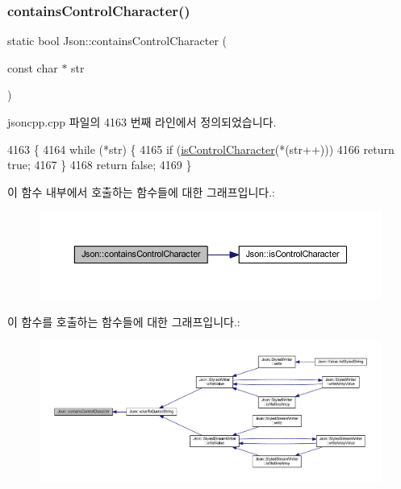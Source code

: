 \subsubsection{\texorpdfstring{contains\+Control\+Character()}{containsControlCharacter()}}
{\footnotesize\ttfamily static bool Json\+::contains\+Control\+Character (\begin{DoxyParamCaption}\item[{const char $\ast$}]{str }\end{DoxyParamCaption})\hspace{0.3cm}{\ttfamily [static]}}



jsoncpp.\+cpp 파일의 4163 번째 라인에서 정의되었습니다.


\begin{DoxyCode}
4163                                                       \{
4164   \textcolor{keywordflow}{while} (*str) \{
4165     \textcolor{keywordflow}{if} (\hyperlink{namespace_json_a0381e631737f51331065a388f4f59197}{isControlCharacter}(*(str++)))
4166       \textcolor{keywordflow}{return} \textcolor{keyword}{true};
4167   \}
4168   \textcolor{keywordflow}{return} \textcolor{keyword}{false};
4169 \}
\end{DoxyCode}
이 함수 내부에서 호출하는 함수들에 대한 그래프입니다.\+:\nopagebreak
\begin{figure}[H]
\begin{center}
\leavevmode
\includegraphics[width=350pt]{namespace_json_aa11b210ff98a4f4dd4e2df19260f8c3a_cgraph}
\end{center}
\end{figure}
이 함수를 호출하는 함수들에 대한 그래프입니다.\+:\nopagebreak
\begin{figure}[H]
\begin{center}
\leavevmode
\includegraphics[width=350pt]{namespace_json_aa11b210ff98a4f4dd4e2df19260f8c3a_icgraph}
\end{center}
\end{figure}
\mbox{\label{namespace_json_ae8a357381f264cf28f46449e79ab1dea}} 
